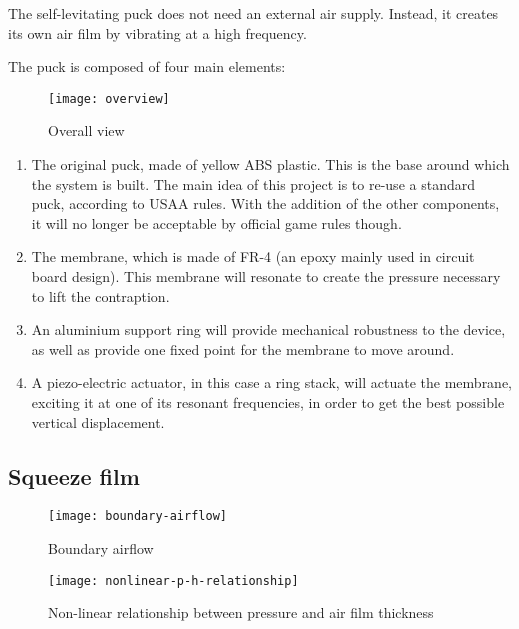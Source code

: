 
The self-levitating puck does not need an external air supply. Instead, it
creates its own air film by vibrating at a high frequency.

The puck is composed of four main elements:

\begin{figure}[h]
  \begin{center}
    \texttt{[image: overview]}
  \end{center}
  \caption{Overall view}
  \label{fig:overview}
\end{figure}

\begin{enumerate}[A]
  \item The original puck, made of yellow ABS plastic. This is the base around
    which the system is built. The main idea of this project is to re-use a
    standard puck, according to USAA rules. With the addition of the other
    components, it will no longer be acceptable by official game rules though.
  \item The membrane, which is made of FR-4 (an epoxy mainly used in circuit
    board design). This membrane will resonate to create the pressure necessary
    to lift the contraption.
  \item An aluminium support ring will provide mechanical robustness to the
    device, as well as provide one fixed point for the membrane to move around.
  \item A piezo-electric actuator, in this case a ring stack, will actuate
    the membrane, exciting it at one of its resonant frequencies, in order to
    get the best possible vertical displacement.
\end{enumerate}


\subsection{Squeeze film}


\begin{figure}[h]
  \begin{center}
    \texttt{[image: boundary-airflow]}
  \end{center}
  \caption{Boundary airflow}
  \label{fig:boundary-airflow}
\end{figure}

\begin{figure}[h]
  \begin{center}
    \texttt{[image: nonlinear-p-h-relationship]}
  \end{center}
  \caption{Non-linear relationship between pressure and air film thickness}
  \label{fig:nonlinear-relationship}
\end{figure}

